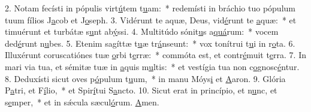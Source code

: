 2. Notam fecísti in pópulis virt\uline{ú}tem t\uline{u}am:~* redemísti in bráchio tuo pópulum tuum fílios J\uline{a}cob et J\uline{o}seph.
3. Vidérunt te aquæ, Deus, vid\uline{é}runt te \uline{a}quæ:~* et timuérunt et turbátæ s\uline{u}nt ab\uline{ý}ssi.
4. Multitúdo sónit\uline{u}s a\uline{quá}rum:~* vocem ded\uline{é}runt n\uline{u}bes.
5. Etenim sagíttæ t\uline{u}æ tr\uline{á}nseunt:~* vox tonítrui t\uline{u}i in r\uline{o}ta.
6. Illuxérunt coruscatiónes tuæ \uline{o}rbi t\uline{e}rræ:~* commóta est, et contr\uline{é}muit t\uline{e}rra.
7. In mari via tua, et sémitæ tuæ in \uline{a}quis m\uline{u}ltis:~* et vestígia tua non c\uline{o}gnosc\uline{é}ntur.
8. Deduxísti sicut oves p\uline{ó}pulum t\uline{u}um,~* in manu Móys\uline{i} et \uline{A}aron.
9. Glória P\uline{a}tri, et F\uline{í}lio,~* et Spir\uline{í}tui S\uline{a}ncto.
10. Sicut erat in princípio, et n\uline{u}nc, et s\uline{e}mper,~* et in sǽcula sæcul\uline{ó}rum. \uline{A}men.
